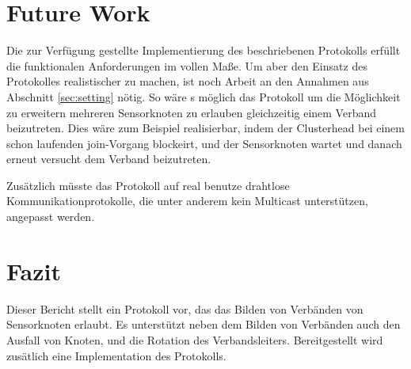 \section{Future Work} \label{sec:futwork}
Die zur Verf\"ugung gestellte Implementierung des beschriebenen Protokolls erf\"ullt die funktionalen Anforderungen im vollen Ma\ss e.
Um aber den Einsatz des Protokolles realistischer zu machen, ist noch Arbeit an den Annahmen aus Abschnitt \ref{sec:setting} n\"otig.
So w\"are s m\"oglich das Protokoll um die M\"oglichkeit zu erweitern mehreren Sensorknoten zu erlauben gleichzeitig einem Verband beizutreten.
Dies w\"are zum Beispiel realisierbar, indem der Clusterhead bei einem schon laufenden join-Vorgang blockeirt, und der Sensorknoten wartet und danach erneut versucht dem Verband beizutreten.

Zus\"atzlich m\"usste das Protokoll auf real benutze drahtlose Kommunikationprotokolle, die unter anderem kein Multicast unterst\"utzen, angepasst werden.

\section{Fazit} \label{sec:conclusion}
Dieser Bericht stellt ein Protokoll vor, das das Bilden von Verb\"anden von Sensorknoten erlaubt. Es unterst\"utzt neben dem Bilden von Verb\"anden auch den Ausfall von Knoten, und die Rotation des Verbandsleiters.
Bereitgestellt wird zus\"atlich eine Implementation des Protokolls.


